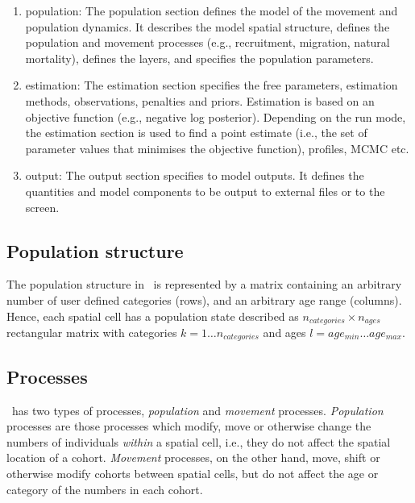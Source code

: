 \begin{enumerate}

\item population: The population section defines the model of the movement and population dynamics. It describes the model spatial structure, defines the population and movement processes (e.g., recruitment, migration, natural mortality), defines the layers, and specifies the population parameters.

\item estimation: The estimation section specifies the free parameters, estimation methods, observations, penalties and priors. Estimation is based on an objective function (e.g., negative log posterior). Depending on the run mode, the estimation section is used to find a point estimate (i.e., the set of parameter values that minimises the objective function), profiles, MCMC etc.

\item output: The output section specifies to model outputs. It defines the quantities and model components to be output to external files or to the screen.

\end{enumerate}

\subsection{Population structure}

The population structure in \SPM\ is represented by a matrix containing an arbitrary number of user defined categories (rows), and an arbitrary age range (columns). Hence, each spatial cell has a population state described as $n_{categories} \times n_{ages}$ rectangular matrix with categories $k=1 \ldots n_{categories}$ and ages $l=age_{min} \ldots age_{max}$. 

\subsection{Processes}

\SPM\  has two types of processes, \emph{population} and \emph{movement} processes. \emph{Population} processes are those processes which modify, move or otherwise change the numbers of individuals \emph{within} a spatial cell, i.e., they do not affect the spatial location of a cohort. \emph{Movement} processes, on the other hand, move, shift or otherwise modify cohorts between spatial cells, but do not affect the age or category of the numbers in each cohort. 

